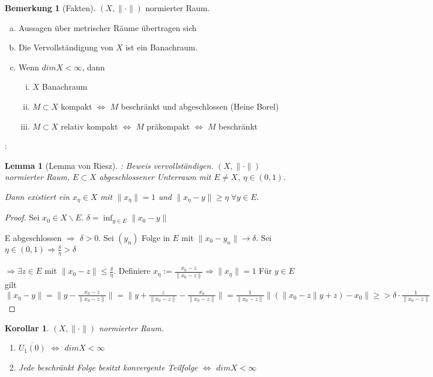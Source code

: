 \documentclass[ngerman]{report}
\theoremstyle{plain}%
\newtheorem{lemma}[thm]{Lemma}
\newtheorem{cor}[thm]{Korollar}
\theoremstyle{definition}%
\theoremstyle{myStyle}
\newtheorem{bem}[thm]{Bemerkung}
\newcommand{\norm}[1]{\|#1\|}
\newcommand{\df}[1][]{%
	\overset{#1}{\Rightarrow}
}
\newcommand{\aq}{\Leftrightarrow} %
\newcommand{\TODO}{\text{$\mathbb{TODO}$}}
\begin{document}
	\begin{bem}[Fakten]
		$(X,\norm{\cdot})$ normierter Raum.
		\begin{enumerate}[a)]
			\item Aussagen über metrischer Räume übertragen sich
			\item Die Vervollständigung von $X$ ist ein Banachraum.
			\item Wenn $dim X < \infty$, dann
				\begin{enumerate}[i)]
					\item $X$ Banachraum
					\item $M\subset X$ kompakt $\aq$ $M$ beschränkt und abgeschlossen (Heine Borel)
					\item $M\subset X$ relativ kompakt $\aq$ $M$ präkompakt  $\aq$ $M$ beschränkt
				\end{enumerate}
		\end{enumerate}
	\end{bem}
\newcommand{\xt}{x_\eta}%
:
	\begin{lemma}[Lemma von Riesz]%
		\TODO: Beweis vervollständigen. $(X,\norm{\cdot})$ normierter Raum, $E\subset X$ abgeschlossener Unterraum mit $E \not = X$, $\eta\in (0,1)$. \par
		Dann existiert ein $x_\eta \in X$ mit $\norm{\xt} = 1$ und $\norm{\xt - y} \geq \eta \; \forall y\in E.$
	\end{lemma}
	\begin{proof}
		Sei $x_0 \in X\backslash E$. $\delta = \inf_{y\in E} \norm{x_0 - y}$ \par
		E abgeschlossen $\df$ $\delta > 0$. Sei $(y_n)$ Folge in $E$ mit $\norm{x_0 - y_n} \to \delta$. Sei $\eta \in (0,1) \df \frac{\delta}{\eta} > \delta $\par
		$\df \exists z\in E$ mit $\norm{x_0 - z} \leq \frac{\delta}{\eta}.$ Definiere $\xt := \frac{x_0-z}{\norm{x_0 - z}} \df \norm{\xt} = 1$
		Für $y\in E$ gilt 
		$\norm{\xt - y} = \norm{y - \frac{x_0-z}{\norm{x_0 - z}}} 
		= \norm{y + \frac{z}{\norm{x_0 - z}} - \frac{x_0}{\norm{x_0 - z}}} = \frac{1}{\norm{x_0 - z}} \norm{(\norm{x_0 - z}y + z) - x_0} 
		\geq> \delta\cdot \frac{1}{\norm{x_0 - z}} \geq \frac{\eta}{\delta} \cdot \delta = \eta$
	\end{proof}	

	\begin{cor}
		$(X,\norm{\cdot})$ normierter Raum.
			\begin{enumerate}
				\item $\overline{U_1(0)}$ $\aq$ $dimX < \infty$
				\item Jede beschränkt Folge besitzt konvergente Teilfolge $\aq$ $dim X< \infty$
			\end{enumerate}
	\end{cor}
\end{document}

